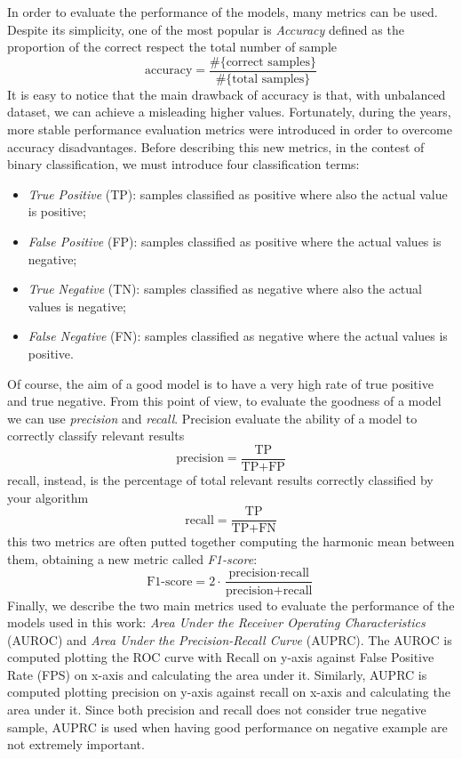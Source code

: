 In order to evaluate the performance of the models, many metrics can be used. Despite its simplicity, one of the most popular is \emph{Accuracy} defined as the proportion of the correct respect the total number of sample
\begin{equation}
    \textrm{accuracy} = \frac{\#\{\textrm{correct samples}\}}{\#\{\textrm{total samples}\}}
\end{equation}
It is easy to notice that the main drawback of accuracy is that, with unbalanced dataset, we can achieve a misleading higher values. Fortunately, during the years, more stable performance evaluation metrics were introduced in order to overcome accuracy disadvantages. Before describing this new metrics, in the contest of binary classification, we must introduce four classification terms: 
\begin{itemize}
\item \emph{True Positive} (TP): samples classified as positive where also the actual value is positive;
\item \emph{False Positive} (FP): samples classified as positive where the actual values is negative;
\item \emph{True Negative} (TN): samples classified as negative where also the actual values is negative;
\item \emph{False Negative} (FN): samples classified as negative where the actual values is positive.
\end{itemize}
Of course, the aim of a good model is to have a very high rate of true positive and true negative. From this point of view, to evaluate the goodness of a model we can use \emph{precision} and \emph{recall}. Precision evaluate the ability of a model to correctly classify relevant results
\begin{equation}
    \textrm{precision} = \frac{\textrm{TP}}{\textrm{TP}+\textrm{FP}}
\end{equation}
recall, instead, is the percentage of total relevant results correctly classified by your algorithm 
\begin{equation}
    \textrm{recall} = \frac{\textrm{TP}}{\textrm{TP}+\textrm{FN}}
\end{equation}
this two metrics are often putted together computing the harmonic mean between them, obtaining a new metric called \emph{F1-score}:
\begin{equation}
    \textrm{F1-score} = 2 \cdot \frac{\textrm{precision} \cdot \textrm{recall}}{\textrm{precision}+\textrm{recall}}
\end{equation}
Finally, we describe the two main metrics used to evaluate the performance of the models used in this work: \emph{Area Under the Receiver Operating Characteristics} (AUROC) and \emph{Area Under the Precision-Recall Curve} (AUPRC). 
The AUROC is computed plotting the ROC curve with Recall on y-axis against False Positive Rate (FPS) on x-axis and calculating the area under it.  Similarly, AUPRC is computed plotting precision on y-axis against recall on x-axis and calculating the area under it. Since both precision and recall does not consider true negative sample, AUPRC is used when having good performance on negative example are not extremely important. 